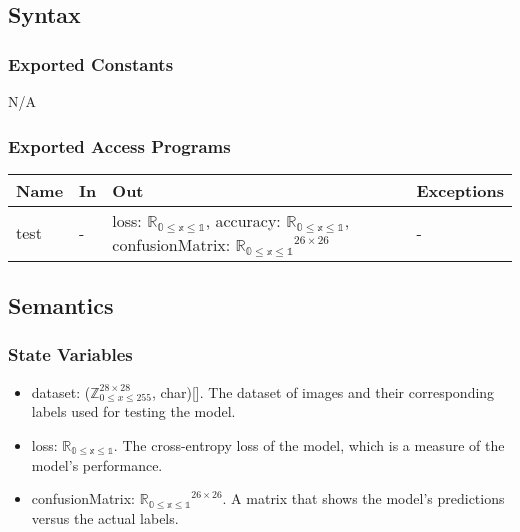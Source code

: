 \documentclass[12pt, titlepage]{article}
\begin{document}
\subsection{Syntax}

\subsubsection{Exported Constants}

N/A

\subsubsection{Exported Access Programs}

\begin{center}
\begin{tabular}{p{2cm} p{2cm} p{6cm} p{2cm}}
\hline
\textbf{Name} & \textbf{In} & \textbf{Out} & \textbf{Exceptions} \\
\hline
test & - & loss: $\mathbb{R_{\text{0} \leq \text{x} \leq \text{1}}}$, accuracy: $\mathbb{R_{\text{0} \leq \text{x} \leq \text{1}}}$, confusionMatrix: $\mathbb{R_{\text{0} \leq \text{x} \leq \text{1}}}^{26 \times 26}$ & - \\
\hline
\end{tabular}
\end{center}

\subsection{Semantics}

\subsubsection{State Variables}

\begin{itemize}
  \item dataset: ($\mathbb{Z}^{28 \times 28}_{0 \le x \le 255}$, char)[]. The
  dataset of images and their corresponding labels used for testing the model.
  \item loss: $\mathbb{R_{\text{0} \leq \text{x} \leq \text{1}}}$. The
  cross-entropy loss of the model, which is a measure of the model's performance.
  \item confusionMatrix: $\mathbb{R_{\text{0} \leq \text{x} \leq \text{1}}}^{26 \times 26}$. A matrix that shows the model's predictions versus the actual labels.
\end{itemize}
\end{document}
